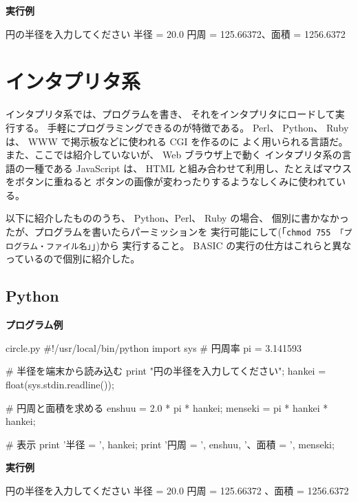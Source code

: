 \noindent
\textbf{実行例}

\begin{progls}
円の半径を入力してください
半径 = 20.0
円周 = 125.66372、面積 = 1256.6372
%
\end{progls}

\section{インタプリタ系}

インタプリタ系では、プログラムを書き、
それをインタプリタにロードして実行する。
手軽にプログラミングできるのが特徴である。
Perl、 Python、 Ruby は、 WWW で掲示板などに使われる CGI を作るのに
よく用いられる言語だ。
また、ここでは紹介していないが、 Web ブラウザ上で動く
インタプリタ系の言語の一種である JavaScript は、
 HTML と組み合わせて利用し、たとえばマウスをボタンに重ねると
ボタンの画像が変わったりするようなしくみに使われている。

以下に紹介したもののうち、 Python、Perl、 Ruby の場合、
個別に書かなかったが、プログラムを書いたらパーミッションを
実行可能にして(「\texttt{chmod 755 「プログラム・ファイル名」}」)から
実行すること。
 BASIC の実行の仕方はこれらと異なっているので個別に紹介した。

\subsection{Python}

\noindent
\textbf{プログラム例}

\begin{progls2}{circle.py}
#!/usr/local/bin/python
import sys
# 円周率
pi = 3.141593

# 半径を端末から読み込む
print "円の半径を入力してください";
hankei = float(sys.stdin.readline());

# 円周と面積を求める
enshuu = 2.0 * pi * hankei;
menseki = pi * hankei * hankei;

# 表示
print '半径 = ', hankei;
print '円周 = ', enshuu, '、面積 = ', menseki;
\end{progls2}

\noindent
\textbf{実行例}

\begin{progls}
円の半径を入力してください
半径 =  20.0
円周 =  125.66372 、面積 =  1256.6372
%
\end{progls}

\newpage

